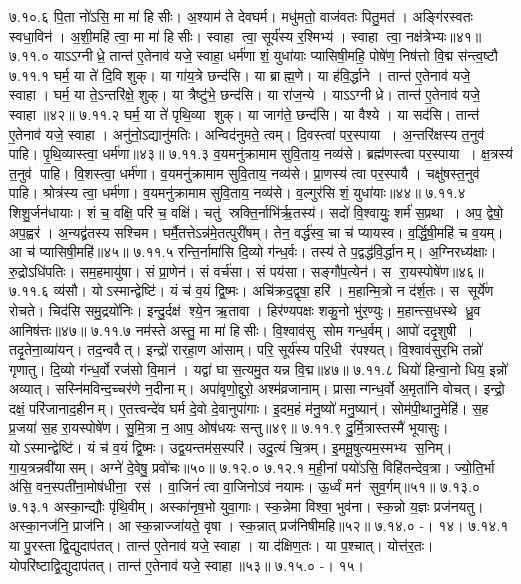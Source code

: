 ७.१०.६
पि॒ता नो॑ऽसि॒ मा मा॑ हिसीः। अ॒श्याम॑ ते देवघर्म। मधु॑मतो॒ वाज॑वतः पितु॒मत॑। अङ्गि॑रस्वतः स्वधा॒विन॑। अ॒शी॒महि॑ त्वा॒ मा मा॑ हिसीः। स्वाहा त्वा॒ सूर्य॑स्य र॒श्मिभ्य॑। स्वाहा त्वा॒ नक्ष॑त्रेभ्यः॥४१॥
७.११.०
याऽऽग्नीध्रे॒ तान्त॑ ए॒तेनाव॑ यजे॒ स्वाहा॒ धर्म॑णा शं॒ युधा॑याः प्यासिषी॒महि॒ पोषे॑ण॒ निष॑त्तो वि॒द्म स॑न्त्व॒ष्टौ
\anuvakamend
७.११.१
घर्म॒ या ते॑ दि॒वि शुक्। या गा॑य॒त्रे छन्द॑सि। या ब्राह्म॒णे। या ह॑वि॒र्द्धाने। तान्त॑ ए॒तेनाव॑ यजे॒ स्वाहा। घर्म॒ या ते॒ऽन्तरि॑क्षे॒ शुक्। या त्रैष्टु॑भे॒ छन्द॑सि। या रा॑ज॒न्ये। याऽऽग्नीध्रे। तान्त॑ ए॒तेनाव॑ यजे॒ स्वाहा॥४२॥
७.११.२
घर्म॒ या ते॑ पृथि॒व्या शुक्। या जाग॑ते॒ छन्द॑सि। या वैश्ये। या सद॑सि। तान्त॑ ए॒तेनाव॑ यजे॒ स्वाहा। अनु॑नो॒ऽद्यानु॑मतिः। अन्विद॑नुमते॒ त्वम्। दि॒वस्त्वा॑ पर॒स्पाया। अ॒न्तरि॑क्षस्य त॒नुव॑ पाहि। पृ॒थि॒व्यास्त्वा॒ धर्म॑णा॥४३॥
७.११.३
व॒यमनु॑क्रामाम सुवि॒ताय॒ नव्य॑से। ब्रह्म॑णस्त्वा पर॒स्पाया। क्ष॒त्रस्य॑ त॒नुव॑ पाहि। वि॒शस्त्वा॒ धर्म॑णा। व॒यमनु॑क्रामाम सुवि॒ताय॒ नव्य॑से। प्रा॒णस्य॑ त्वा पर॒स्पायै। चक्षु॑षस्त॒नुव॑ पाहि। श्रोत्र॑स्य त्वा॒ धर्म॑णा। व॒यमनु॑क्रामाम सुवि॒ताय॒ नव्य॑से। व॒ल्गुर॑सि शं॒ युधा॑याः॥४४॥
७.११.४
शिशु॒र्जन॑धायाः। शं च॒ वक्षि॒ परि॑ च॒ वक्षि॑। चतु॑ स्रक्ति॒र्नाभि॑र्\mbox{}ऋ॒तस्य॑। सदो॑ वि॒श्वायुः॒ शर्म॑ स॒प्रथा। अप॒ द्वेषो॒ अप॒ह्वर॑। अ॒न्यद्व्र॑तस्य सश्चिम। घर्मै॒तत्तेऽन्न॑मे॒तत्पुरी॑षम्। तेन॒ वर्द्ध॑स्व॒ चा च॑ प्यायस्व। व॒र्द्धि॒षी॒महि॑ च व॒यम्। आ च॑ प्यासिषी॒महि॑॥४५॥
७.११.५
रन्ति॒र्नामा॑सि दि॒व्यो ग॑न्ध॒र्वः। तस्य॑ ते प॒द्वद्ध॑वि॒र्द्धानम्। अ॒ग्निरध्य॑क्षाः। रु॒द्रोऽधि॑पतिः। सम॒हमायु॑षा। सं प्रा॒णेन॑। सं वर्च॑सा। सं पय॑सा। सङ्गौ॑प॒त्येन॑। स रा॒यस्पोषे॑ण॥४६॥
७.११.६
व्य॑सौ। योऽस्मान्द्वेष्टि॑। यं च॑ व॒यं द्वि॒ष्मः। अचि॑क्रद॒द्वृषा॒ हरि॑। म॒हान्मि॒त्रो न द॑र्\mbox{}श॒तः। स सूर्ये॑ण रोचते। चिद॑सि समु॒द्रयो॑निः। इन्दु॒र्दक्ष॑ श्ये॒न ऋ॒तावा। हिर॑ण्यपक्षः  शकु॒नो भु॑र॒ण्युः। म॒हान्त्स॒धस्थे ध्रु॒व आनिष॑त्तः॥४७॥
७.११.७
नम॑स्ते अस्तु॒ मा मा॑ हिसीः। वि॒श्वाव॑सु सोम गन्ध॒र्वम्। आपो॑ ददृ॒शुषी। तदृ॒तेना॒व्या॑यन्। तद॒न्ववैत्। इन्द्रो॑ रारहा॒ण आ॑साम्। परि॒ सूर्य॑स्य परि॒धी र॑पश्यत्। वि॒श्वाव॑सुर॒भि तन्नो॑ गृणातु। दि॒व्यो ग॑न्ध॒र्वो रज॑सो वि॒मान॑। यद्वा॑ घा स॒त्यमु॒त यन्न वि॒द्म॥४७॥
७.११.८
धियो॑ हिन्वा॒नो धिय॒ इन्नो॑ अव्यात्। सस्नि॑मविन्द॒च्चर॑णे न॒दीनाम्। अपा॑वृणो॒द्दुरो॒ अश्म॑व्रजानाम्। प्रासान्गन्ध॒र्वो अ॒मृता॑नि वोचत्। इन्द्रो॒ दक्षं॒ परि॑जानाद॒हीनम्। ए॒तत्त्वन्दे॑व घर्म दे॒वो दे॒वानुपा॑गाः। इ॒दम॒हं म॑नु॒ष्यो॑ मनु॒ष्यान्॑। सोम॑पी॒थानु॒मेहि॑। स॒ह प्र॒जया॑ स॒ह रा॒यस्पोषे॑ण। सु॒मि॒त्रा न॒ आप॒ ओष॑धयः सन्तु॥४९॥
७.११.९
दु॒र्मि॒त्रास्तस्मै॑ भूयासुः। योऽस्मान्द्वेष्टि॑। यं च॑ व॒यं द्वि॒ष्मः। उद्व॒यन्तम॑स॒स्परि॑। उदु॒त्यं चि॒त्रम्। इ॒ममू॒षुत्यम॒स्मभ्य स॒निम्। गा॒य॒त्रन्नवी॑यासम्। अग्ने॑ दे॒वेषु॒ प्रवो॑चः॥५०॥
७.१२.०
\anuvakamend
७.१२.१
म॒ही॒नां पयो॑ऽसि॒ विहि॑तन्देव॒त्रा। ज्यो॒ति॒र्भा अ॑सि॒ वन॒स्पती॑ना॒मोष॑धीना॒ रस॑। वा॒जिनं॑ त्वा वा॒जिनोऽव॑ नयामः। ऊ॒र्ध्वं मन॑ सुव॒र्गम्॥५१॥
७.१३.०
\anuvakamend
७.१३.१
अस्का॒न्द्यौः पृ॑थि॒वीम्। अस्का॑नृष॒भो युवा॒गाः। स्क॒न्नेमा विश्वा॒ भुव॑ना। स्क॒न्नो य॒ज्ञः प्रज॑नयतु। अस्का॒नज॑नि॒ प्राज॑नि। आ स्क॒न्नाज्जा॑यते॒ वृषा। स्क॒न्नात् प्रज॑निषीमहि॥५२॥
७.१४.०
-। १४।
\anuvakamend
७.१४.१
या पु॒रस्ताद्वि॒द्युदाप॑तत्। तान्त॑ ए॒तेनाव॑ यजे॒ स्वाहा। या द॑क्षिण॒तः। या प॒श्चात्। योत्त॑र॒तः। योपरि॑ष्टाद्वि॒द्युदाप॑तत्। तान्त॑ ए॒तेनाव॑ यजे॒ स्वाहा॥५३॥
७.१५.०
-। १५।
\anuvakamend

